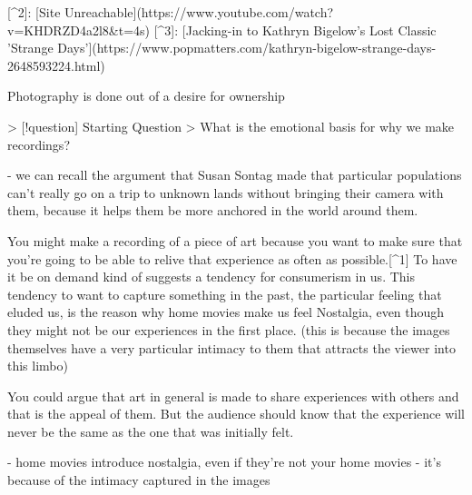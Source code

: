 \documentclass[12pt]{article}
\begin{document}
[^2]: [Site Unreachable](https://www.youtube.com/watch?v=KHDRZD4a2l8&t=4s)
[^3]: [Jacking-in to Kathryn Bigelow's Lost Classic 'Strange Days'](https://www.popmatters.com/kathryn-bigelow-strange-days-2648593224.html)

Photography is done out of a desire for ownership

> [!question] Starting Question
> What is the emotional basis for why we make recordings?

- we can recall the argument that Susan Sontag made that particular populations can't really go on a trip to unknown lands without bringing their camera with them, because it helps them be more anchored in the world around them.

You might make a recording of a piece of art because you want to make sure that you're going to be able to relive that experience as often as possible.[^1] To have it be on demand kind of suggests a tendency for consumerism in us. This tendency to want to capture something in the past, the particular feeling that eluded us, is the reason why home movies make us feel Nostalgia, even though they might not be our experiences in the first place. (this is because the images themselves have a very particular intimacy to them that attracts the viewer into this limbo)

You could argue that art in general is made to share experiences with others and that is the appeal of them. But the audience should know that the experience will never be the same as the one that was initially felt.

- home movies introduce nostalgia, even if they're not your home movies
- it's because of the intimacy captured in the images


\printbibliography
	
\end{document}
